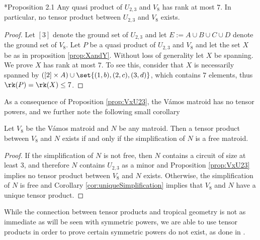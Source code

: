    \begin{proposition}\label{prop:VxU23}\cite{LV81}*{Proposition 2.1}
    Any quasi product of $U_{2,3}$ and $V_8$ has rank at most $7$. In particular, no tensor product between $U_{2,3}$ and $V_8$ exists.
    \end{proposition}
    \begin{proof}
        Let $[3]$ denote the ground set of $U_{2,3}$ and let $E:=A\cup B\cup C\cup D$ denote the ground set of $V_8$. Let $P$ be a quasi product of $U_{2,3}$ and $V_8$ and let the set $X$ be as in proposition \ref{prop:XandY}. Without loss of generality let $X$ be spanning. We prove $X$ has rank at most $7$. To see this, consider that $X$ is necessarily spanned by $([2]\times A)\cup \set{(1,b), (2,c), (3,d)}$, which contains $7$ elements, thus $\rk(P)=\rk(X)\leq 7$.
    \end{proof}
    
    As a consequence of Proposition \ref{prop:VxU23}, the V\'amos matroid has no tensor powers, and we further note the following small corollary
    
    \begin{corollary}\label{cor:VxU23}
    Let $V_8$ be the V\'amos matroid and $N$ be any matroid. Then a tensor product between $V_8$ and $N$ exists if and only if the simplification of $N$ is a free matroid. 
    \end{corollary}
    \begin{proof}
    If the simplification of $N$ is not free, then $N$ contains a circuit of size at least 3, and therefore $N$ contains $U_{2,3}$ as a minor and Proposition \ref{prop:VxU23} implies no tensor product between $V_8$ and $N$ exists. Otherwise, the simplification of $N$ is free and Corollary \ref{cor:uniqueSimplification} implies that $V_8$ and $N$ have a unique tensor product.
    \end{proof}
       
    While the connection between tensor products and tropical geometry is not as immediate as will be seen with symmetric powers, we are able to use tensor products in order to prove certain symmetric powers do not exist, as done in \cite{DR19}.




